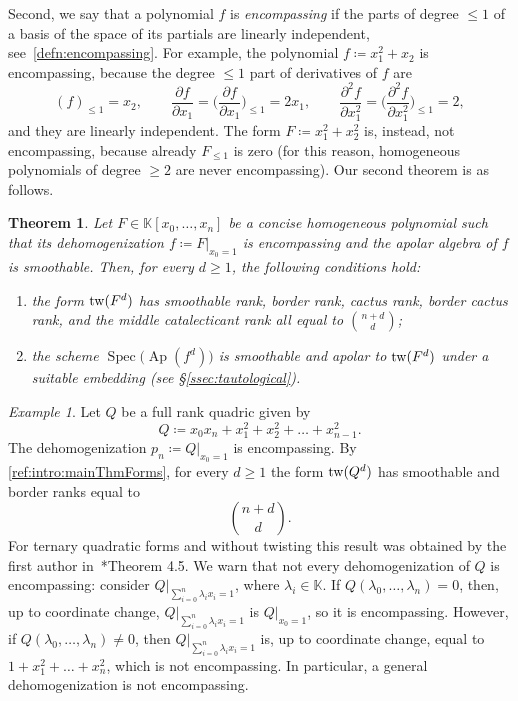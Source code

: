 \documentclass[a4paper,11pt,reqno]{amsart}
\newcommand{\bbK}{\mathbb{K}}
\DeclareMathOperator{\Ap}{Ap}
\DeclareMathOperator{\Spec}{Spec}
\numberwithin{equation}{section}
\theoremstyle{definition}
\theoremstyle{plain}
\newtheorem{teo}[defn]{Theorem}
\theoremstyle{remark}
\newtheorem{exam}[defn]{Example}
\begin{document}
Second, we say that
a polynomial $f$ is \emph{encompassing} if the parts of degree $\leq 1$ of
a
basis of the space of its partials are linearly independent, see~\autoref{defn:encompassing}.
For example, the polynomial $f\coloneq x_1^2 + x_2$ is
encompassing, because the degree $\leq 1$ part of derivatives of $f$ are
\[(f)_{\leq 1}=x_2,\qquad \frac{\partial
f}{\partial x_1} =\biggl(\frac{\partial
f}{\partial x_1}\biggr)_{\leq 1} =2x_1,\qquad\frac{\partial^2 f}{\partial
x_1^2} = \biggl(\frac{\partial^2 f}{\partial x_1^2}\biggr)_{\leq 1}=2,\] and
they are
linearly independent. The form $F \coloneq x_1^2 +x_2^2$ is, instead, not
encompassing, because already
$F_{\leq 1}$ is zero {(for this reason, homogeneous polynomials of degree $\geq 2$ are never encompassing)}.
Our second theorem is as follows.
\begin{teo}\label{ref:intro:mainThmForms}
    Let $F\in \bbK[x_0, \ldots ,x_n]$ be a concise homogeneous polynomial such that
    its dehomogenization $f\coloneq F|_{x_0=1}$ is encompassing and the apolar
    algebra of $f$ is smoothable. Then, for every $d\geq 1$, the following
    conditions hold:
\begin{enumerate}[label=(\arabic*), left= 3pt, widest=2,nosep]
        \item the form $\mathrm{tw}(F^d)$ has smoothable rank, border
            rank, cactus
            rank, border cactus rank, and
            the middle catalecticant rank all equal to $\binom{n+d}{d}$;
        \item the scheme
            $\Spec \bigl(\Ap(f^d)\bigr)$ is smoothable and apolar to
            $\mathrm{tw}(F^d)$ under a
            suitable embedding (see \S\ref{ssec:tautological}).
    \end{enumerate}
\end{teo}
\begin{exam}\label{ex:quadrics}
    Let $Q$ be a full rank quadric given by \[Q \coloneq x_0x_n + x_1^2 + x_2^2 +  \ldots +
    x_{n-1}^{2}.
\]
    The dehomogenization $p_n \coloneq Q|_{x_0 = 1}$ is encompassing.
    By \autoref{ref:intro:mainThmForms}, for every $d\geq 1$ the form
    $\mathrm{tw}(Q^d)$ has
    smoothable and border ranks equal to
    \[
        \binom{n+d}{d}.
    \]
    For ternary
    quadratic forms and without twisting this result was obtained by the first author
    in~\cite{Fla23}*{Theorem 4.5}. We warn that not every dehomogenization
    of $Q$ is encompassing: consider $Q|_{\sum_{i=0}^n \lambda_ix_i = 1}$, where $\lambda_i\in \bbK$. If $Q(\lambda_0,\ldots,\lambda_n) = 0$, then, up to coordinate change, $Q|_{\sum_{i=0}^n \lambda_ix_i = 1}$ is $Q|_{x_0 = 1}$, so it is encompassing. However, if $Q(\lambda_0,\ldots,\lambda_n) \neq 0$, then $Q|_{\sum_{i=0}^n \lambda_ix_i = 1}$ is, up to coordinate change, equal to $1 + x_1^2 + \ldots + x_n^2$, which is not encompassing. In particular, a general dehomogenization is not encompassing.
\end{exam}
\end{document}
